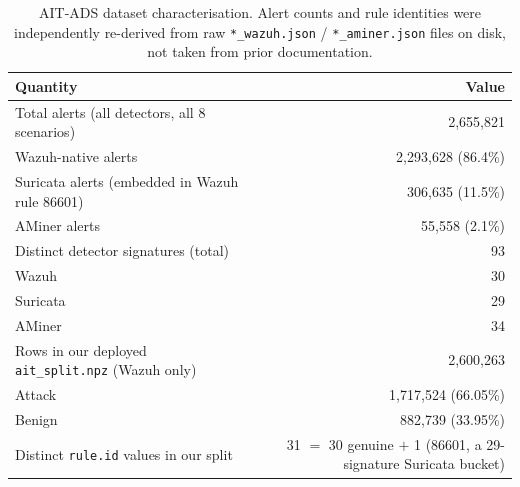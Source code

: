 
\begin{table}[t]
\centering
\caption{AIT-ADS dataset characterisation. Alert counts and rule identities
were independently re-derived from raw \texttt{*\_wazuh.json} /
\texttt{*\_aminer.json} files on disk, not taken from prior documentation.}
\label{tab:dataset-characterisation}
\begin{tabular}{lr}
\toprule
Quantity & Value \\
\midrule
Total alerts (all detectors, all 8 scenarios) & 2{,}655{,}821 \\
\quad Wazuh-native alerts & 2{,}293{,}628 (86.4\%) \\
\quad Suricata alerts (embedded in Wazuh rule 86601) & 306{,}635 (11.5\%) \\
\quad AMiner alerts & 55{,}558 (2.1\%) \\
Distinct detector signatures (total) & 93 \\
\quad Wazuh & 30 \\
\quad Suricata & 29 \\
\quad AMiner & 34 \\
Rows in our deployed \texttt{ait\_split.npz} (Wazuh only) & 2{,}600{,}263 \\
\quad Attack & 1{,}717{,}524 (66.05\%) \\
\quad Benign & 882{,}739 (33.95\%) \\
Distinct \texttt{rule.id} values in our split & 31 $=$ 30 genuine $+$ 1 (86601, a 29-signature Suricata bucket) \\
\bottomrule
\end{tabular}
\end{table}

